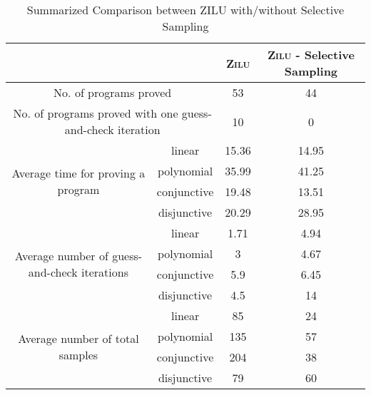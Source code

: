 \begin{table}[t]
\scriptsize
\centering
\caption{Summarized Comparison between ZILU with/without Selective Sampling}
\begin{tabular}{  c | c| c | c }
\multicolumn{2}{c|}{} & \textsc{Zilu} & \textsc{Zilu} - Selective Sampling \\
\hline
\multicolumn{2}{c|}{No. of programs proved} 			& 53 & 44		\\
\hline
\multicolumn{2}{c|}{No. of programs proved with one guess-and-check iteration} & 10 & 0		\\
\hline
\multirow{ 4}{*}{Average time for proving a program} 
 & linear & 15.36 & 14.95  			\\
 & polynomial & 35.99 & 41.25  			\\
 & conjunctive & 19.48 & 13.51  			\\
 & disjunctive & 20.29 & 28.95  			\\
\hline
\multirow{ 4}{*}{Average number of guess-and-check iterations}
& linear & 1.71 & 4.94  			\\
& polynomial & 3 & 4.67  			\\
& conjunctive & 5.9 & 6.45  			\\
& disjunctive & 4.5 & 14  			\\
\hline
\multirow{ 4}{*}{Average number of total samples}
& linear & 85 & 24  			\\
& polynomial & 135 & 57  			\\
& conjunctive & 204 & 38  			\\
& disjunctive & 79 & 60  			\\
\hline
\end{tabular}
\label{summary}
\end{table}


